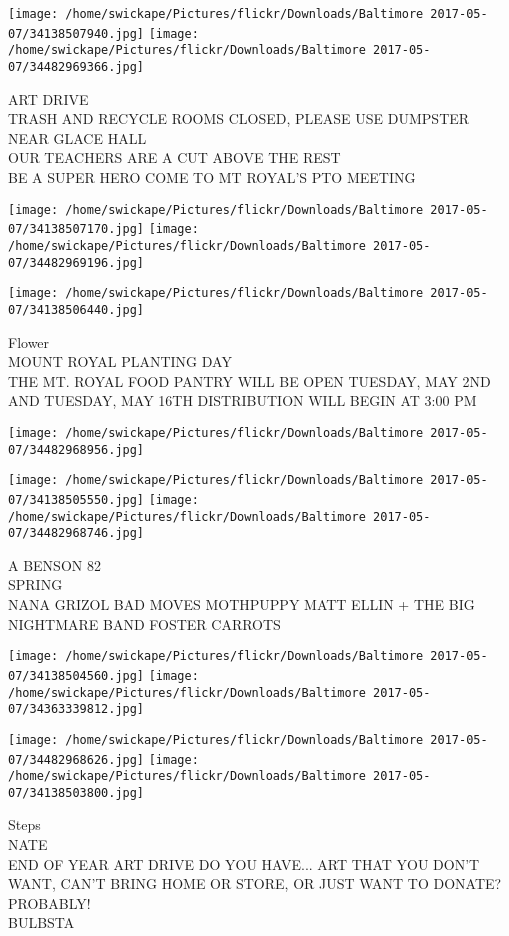 \documentclass[10pt,letterpaper]{article}
\begin{document}
\texttt{[image: /home/swickape/Pictures/flickr/Downloads/Baltimore 2017-05-07/34138507940.jpg]}
\texttt{[image: /home/swickape/Pictures/flickr/Downloads/Baltimore 2017-05-07/34482969366.jpg]}

ART DRIVE\\
TRASH AND RECYCLE ROOMS CLOSED, PLEASE USE DUMPSTER NEAR GLACE HALL\\
OUR TEACHERS ARE A CUT ABOVE THE REST\\
BE A SUPER HERO COME TO MT ROYAL'S PTO MEETING
\pagebreak

\texttt{[image: /home/swickape/Pictures/flickr/Downloads/Baltimore 2017-05-07/34138507170.jpg]}
\texttt{[image: /home/swickape/Pictures/flickr/Downloads/Baltimore 2017-05-07/34482969196.jpg]}

\texttt{[image: /home/swickape/Pictures/flickr/Downloads/Baltimore 2017-05-07/34138506440.jpg]}

Flower\\
MOUNT ROYAL PLANTING DAY\\
THE MT. ROYAL FOOD PANTRY WILL BE OPEN TUESDAY, MAY 2ND AND TUESDAY, MAY 16TH DISTRIBUTION WILL BEGIN AT 3:00 PM
\pagebreak

\texttt{[image: /home/swickape/Pictures/flickr/Downloads/Baltimore 2017-05-07/34482968956.jpg]}

\vspace{0.25in}
\texttt{[image: /home/swickape/Pictures/flickr/Downloads/Baltimore 2017-05-07/34138505550.jpg]}
\texttt{[image: /home/swickape/Pictures/flickr/Downloads/Baltimore 2017-05-07/34482968746.jpg]}

A BENSON 82\\
SPRING\\
NANA GRIZOL BAD MOVES MOTHPUPPY MATT ELLIN + THE BIG NIGHTMARE BAND FOSTER CARROTS
\pagebreak

\texttt{[image: /home/swickape/Pictures/flickr/Downloads/Baltimore 2017-05-07/34138504560.jpg]}
\texttt{[image: /home/swickape/Pictures/flickr/Downloads/Baltimore 2017-05-07/34363339812.jpg]}

\texttt{[image: /home/swickape/Pictures/flickr/Downloads/Baltimore 2017-05-07/34482968626.jpg]}
\texttt{[image: /home/swickape/Pictures/flickr/Downloads/Baltimore 2017-05-07/34138503800.jpg]}

Steps\\
NATE\\
END OF YEAR ART DRIVE DO YOU HAVE... ART THAT YOU DON'T WANT, CAN'T BRING HOME OR STORE, OR JUST WANT TO DONATE?  PROBABLY!\\
BULBSTA
\pagebreak
\end{document}
